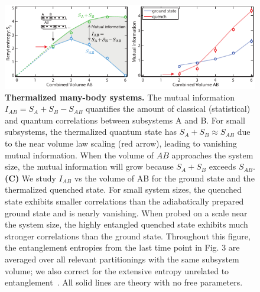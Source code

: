 \begin{figure}
	\centering
	\includegraphics[scale=1.4]{figures/ETH_MI.pdf}
	\caption{{\bf Thermalized many-body systems.} The mutual information $I_{AB} = S_A + S_B - S_{AB}$ quantifies the amount of classical (statistical) and quantum correlations between subsystems A and B. For small subsystems, the thermalized quantum state has $S_A + S_B \approx S_{AB}$ due to the near volume law scaling (red arrow), leading to vanishing mutual information. When the volume of $AB$ approaches the system size, the mutual information will grow because $S_A + S_B$ exceeds $S_{AB}$. {\bf (C)} We study $I_{AB}$ vs the volume of AB for the ground state and the thermalized quenched state. For small system sizes, the quenched state exhibits smaller correlations than the adiabatically prepared ground state and is nearly vanishing. When probed on a scale near the system size, the highly entangled quenched state exhibits much stronger correlations than the ground state. Throughout this figure, the entanglement entropies from the last time point in Fig. 3 are averaged over all relevant partitionings with the same subsystem volume; we also correct for the extensive entropy unrelated to entanglement~\cite{Supplement}. All solid lines are theory with no free parameters.}
	\label{fig:MI}
\end{figure} 

